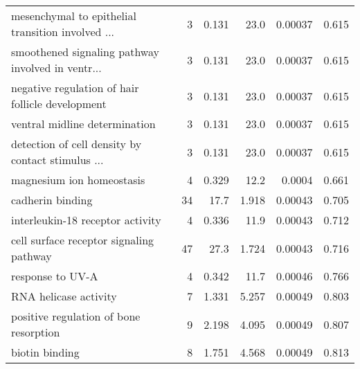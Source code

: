 \begin{longtable}{lrrrrr}
 mesenchymal to epithelial transition involved ... &                       3 &                   0.131 &       23.0 &              0.00037 &                0.615 \\
 smoothened signaling pathway involved in ventr... &                       3 &                   0.131 &       23.0 &              0.00037 &                0.615 \\
  negative regulation of hair follicle development &                       3 &                   0.131 &       23.0 &              0.00037 &                0.615 \\
                     ventral midline determination &                       3 &                   0.131 &       23.0 &              0.00037 &                0.615 \\
 detection of cell density by contact stimulus ... &                       3 &                   0.131 &       23.0 &              0.00037 &                0.615 \\
                         magnesium ion homeostasis &                       4 &                   0.329 &       12.2 &               0.0004 &                0.661 \\
                                  cadherin binding &                      34 &                    17.7 &      1.918 &              0.00043 &                0.705 \\
                  interleukin-18 receptor activity &                       4 &                   0.336 &       11.9 &              0.00043 &                0.712 \\
           cell surface receptor signaling pathway &                      47 &                    27.3 &      1.724 &              0.00043 &                0.716 \\
                                  response to UV-A &                       4 &                   0.342 &       11.7 &              0.00046 &                0.766 \\
                             RNA helicase activity &                       7 &                   1.331 &      5.257 &              0.00049 &                0.803 \\
            positive regulation of bone resorption &                       9 &                   2.198 &      4.095 &              0.00049 &                0.807 \\
                                    biotin binding &                       8 &                   1.751 &      4.568 &              0.00049 &                0.813 \\

\end{longtable}
